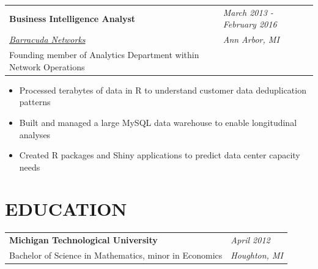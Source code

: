 \documentclass[margin,line]{res}
\begin{document}
\begin{resume}
  
  \begin{tabular}{p{4.6in} l}
    {\bf Business Intelligence Analyst}                       & \emph{March 2013 - February 2016} \\
    \href{https://www.barracuda.com/}{\it Barracuda Networks} & \emph{Ann Arbor, MI}              \\
    Founding member of Analytics Department within Network Operations
  \end{tabular}
  \vspace{2pt}
  \begin{itemize}\itemsep -2pt
    \item Processed terabytes of data in R to understand customer data deduplication patterns
    \item Built and managed a large MySQL data warehouse to enable longitudinal analyses
    \item Created R packages and Shiny applications to predict data center capacity needs
  \end{itemize}
  
  
  \vspace{25pt}
  
  
  \section{EDUCATION}
  
  \begin{tabular}{p{4.6in} l}
    {\bf Michigan Technological University}                & \emph{April 2012}   \\
    Bachelor of Science in Mathematics, minor in Economics & \emph{Houghton, MI} \\
  \end{tabular}
  
  
\end{resume}
\end{document}
